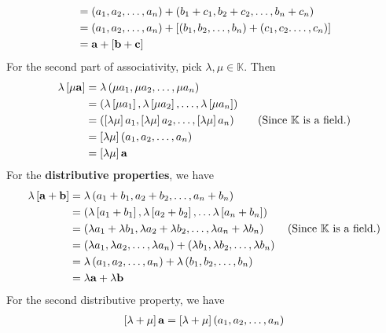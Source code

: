 \begin{example}
\begin{align*}
    &= \left( a_{1}, a_{2}, \dots, a_{n} \right) +\left( b_{1} + c_{1}, b_{2} + c_{2}, \dots, b_{n} + c_{n} \right) \\
    &=  \left( a_{1}, a_{2}, \dots, a_{n} \right) + \left[  \left( b_{1}, b_{2}, \dots , b_{n} \right) +  \left( c_{1}, c_{2}. \dots, c_{n} \right)\right] \\
    &=\vb{a} + \left[ \vb{b} + \vb{c} \right]
  \end{align*}
  For the second part of associativity, pick \( \lambda, \mu \in \mathbb{K} \). Then 
  \begin{align*}
    \lambda \left[ \mu \vb{a} \right] &= \lambda \left( \mu a _{1}, \mu a_{2}, \dots, \mu a_{n} \right) \\
    &= \left( \lambda \left[ \mu a_{1} \right], \lambda \left[ \mu a_{2} \right], \dots, \lambda \left[ \mu a_{n} \right] \right) \\
    &= \left( \left[ \lambda \mu \right] a_{1},  \left[ \lambda \mu \right] a_{2}, \dots , \left[ \lambda \mu \right] a_{n} \right) \tag{Since $\mathbb{K}$ is a field.} \\
    &= \left[ \lambda \mu \right] \left( a_{1}, a_{2}, \dots, a_{n} \right) \\ 
    &= \left[ \lambda \mu \right] \vb{a}
  \end{align*}
  For the \textbf{distributive properties}, we have 
  \begin{align*}
    \lambda \left[ \vb{a} + \vb{b} \right] &= \lambda \left( a_{1} +b_{1}, a_{2} +b_{2}, \dots, a_{n} +b_{n} \right) \\
    &= \left( \lambda \left[ a_{1} + b_{1} \right],  \lambda \left[ a_{2} + b_{2} \right], \dots  \lambda \left[ a_{n} + b_{n} \right] \right) \\
    &= \left( \lambda a_{1} + \lambda b_{1}, \lambda a_{2} + \lambda b_{2} , \dots , \lambda a_{n} + \lambda b_{n}  \right) \tag{Since $\mathbb{K}$ is a field.} \\
    &= \left( \lambda a_{1}, \lambda a_{2}, \dots, \lambda a_{n} \right) +\left( \lambda b_{1}, \lambda b_{2}, \dots, \lambda b_{n} \right) \\
    &= \lambda \left( a_{1}, a_{2}, \dots, a_{n} \right) + \lambda\left( b_{1}, b_{2}, \dots , b_{n} \right) \\
    &= \lambda \vb{a} + \lambda \vb{b}
  \end{align*}
For the second distributive property, we have 
\begin{align*}
  \left[ \lambda + \mu \right] \vb{a} &= \left[ \lambda + \mu \right] \left( a_{1}, a_{2}, \dots, a_{n} \right) \\

\end{align*}
\end{example}
